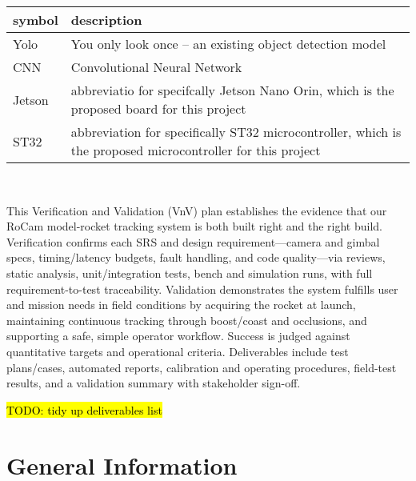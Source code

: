 \documentclass[12pt, titlepage]{article}
\begin{document}
\renewcommand{\arraystretch}{1.2}
\begin{tabular}{l l}
  \toprule
  \textbf{symbol} & \textbf{description}                                             \\
  \midrule
  Yolo            & You only look once -- an existing object detection model         \\
  CNN             & Convolutional Neural Network                                     \\
  Jetson          & abbreviatio for specifcally Jetson Nano Orin, which is the
  proposed board for this project
  \\
  ST32            & abbreviation for specifically ST32 microcontroller, which is the
  proposed microcontroller for this project                                          \\

  \bottomrule
\end{tabular}\\



\newpage


This Verification and Validation (VnV) plan establishes the evidence that our
RoCam model-rocket tracking system is both built right and the right build.
Verification confirms each SRS and design requirement—camera and gimbal specs,
timing/latency budgets, fault handling, and code quality—via reviews, static
analysis, unit/integration tests, bench and simulation runs, with full
requirement-to-test traceability. Validation demonstrates the system fulfills
user and mission needs in field conditions by acquiring the rocket at launch,
maintaining continuous tracking through boost/coast and occlusions, and
supporting a safe, simple operator workflow. Success is judged against
quantitative targets and operational criteria. Deliverables include test
plans/cases, automated reports, calibration and operating procedures,
field-test results, and a validation summary with stakeholder sign-off.

\hl{TODO: tidy up deliverables list}


\section{General Information}
\end{document}
